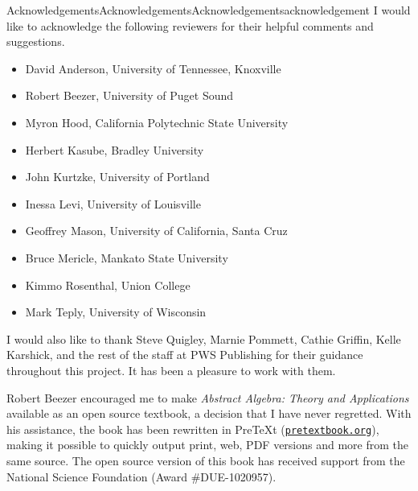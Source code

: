 \documentclass[oneside,10pt,]{book}
\numberwithin{equation}{section}
\begin{document}
\clearpage
%
%
\typeout{************************************************}
\typeout{************************************************}
%
\begin{acknowledgement}{Acknowledgements}{Acknowledgements}{}{Acknowledgements}{}{}{acknowledgement}
I would like to acknowledge the following reviewers for their helpful comments and suggestions.%
\begin{itemize}[label=\textbullet]
\item{}David Anderson, University of Tennessee, Knoxville%
\item{}Robert Beezer, University of Puget Sound%
\item{}Myron Hood, California Polytechnic State University%
\item{}Herbert Kasube, Bradley University%
\item{}John Kurtzke, University of Portland%
\item{}Inessa Levi, University of Louisville%
\item{}Geoffrey Mason, University of California, Santa Cruz%
\item{}Bruce Mericle, Mankato State University%
\item{}Kimmo Rosenthal, Union College%
\item{}Mark Teply, University of Wisconsin%
\end{itemize}
%
\par
I would also like to thank Steve Quigley, Marnie Pommett, Cathie Griffin, Kelle Karshick, and the rest of the staff at PWS Publishing for their guidance throughout this project. It has been a pleasure to work with them.%
\par
Robert Beezer encouraged me to make \emph{Abstract Algebra: Theory and Applications} available as an open source textbook, a decision that I have never regretted.  With his assistance, the book has been rewritten in PreTeXt (\href{https://pretextbook.org}{\nolinkurl{pretextbook.org}}), making it possible to quickly output print, web, PDF versions and more from the same source.  The open source version of this book has received support from the National Science Foundation (Award \#DUE-1020957).%
\end{acknowledgement}
%
%
\typeout{************************************************}
\typeout{************************************************}
%
\end{document}
